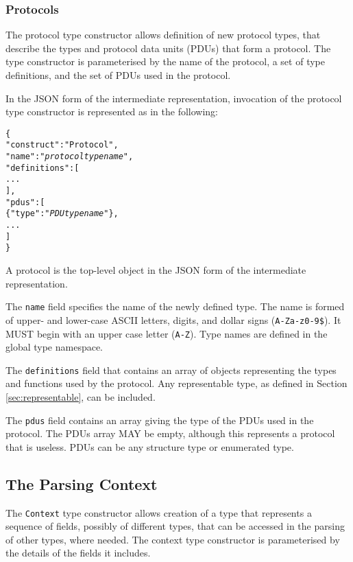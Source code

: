 \documentclass[10pt,twocolumn,a4paper]{article}
\newcommand{\code}[1]{\texttt{#1}}
\begin{document}
\subsubsection{Protocols}

The protocol type constructor allows definition of new protocol types, that
describe the types and protocol data units (PDUs) that form a protocol. The
type constructor is parameterised by the name of the protocol, a set of
type definitions, and the set of PDUs used in the protocol.

In the JSON form of the intermediate representation, invocation of the
protocol type constructor is represented as in the following:
\footnotesize
\begin{alltt}
  \{
    "construct"   : "Protocol",
    "name"        : "\emph{protocol type name}",
    "definitions" : [
                      ...
                    ],
    "pdus"        : [
      \{"type" : "\emph{PDU type name}"\},
      ...
    ]
  \}
\end{alltt}
\normalsize
A protocol is the top-level object in the JSON form of the intermediate
representation.

The \code{name} field specifies the name of the newly defined type. The
name is formed of upper- and lower-case ASCII letters, digits, and dollar
signs (\code{A-Za-z0-9\$}).  It MUST begin with an upper case letter
(\code{A-Z}). Type names are defined in the global type namespace.

The \code{definitions} field that contains an array of objects representing
the types and functions used by the protocol. Any representable type, as
defined in Section \ref{sec:representable}, can be included.

The \code{pdus} field contains an array giving the type of the PDUs used
in the protocol. The PDUs array MAY be empty, although this represents a
protocol that is useless. PDUs can be any structure type or enumerated
type. 

\subsection{The Parsing Context}
\label{sec:context}

The \code{Context} type constructor allows creation of a type that
represents a sequence of fields, possibly of different types, that can be
accessed in the parsing of other types, where needed. The context type
constructor is parameterised by the details of the fields it includes.
\end{document}
